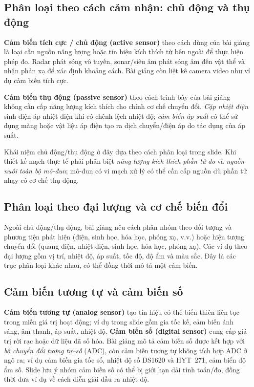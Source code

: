 \subsection{Phân loại theo cách cảm nhận: chủ động và thụ động}
\textbf{Cảm biến tích cực / chủ động (active sensor)} theo cách dùng của bài giảng là loại cần nguồn năng lượng hoặc tín hiệu kích thích từ bên ngoài để thực hiện phép đo. Radar phát sóng vô tuyến, sonar/siêu âm phát sóng âm đến vật thể và nhận phản xạ để xác định khoảng cách. Bài giảng còn liệt kê camera video như ví dụ cảm biến tích cực.

\textbf{Cảm biến thụ động (passive sensor)} theo cách trình bày của bài giảng không cần cấp năng lượng kích thích cho chính cơ chế chuyển đổi. \emph{Cặp nhiệt điện} sinh điện áp nhiệt điện khi có chênh lệch nhiệt độ; \emph{cảm biến áp suất} có thể sử dụng màng hoặc vật liệu áp điện tạo ra dịch chuyển/điện áp do tác dụng của áp suất.
\begin{noteiot}
Khái niệm chủ động/thụ động ở đây dựa theo cách phân loại trong slide. Khi thiết kế mạch thực tế phải phân biệt \emph{năng lượng kích thích phần tử đo} và \emph{nguồn nuôi toàn bộ mô-đun}; mô-đun có vi mạch xử lý có thể cần cấp nguồn dù phần tử nhạy có cơ chế thụ động.
\end{noteiot}
\subsection{Phân loại theo đại lượng và cơ chế biến đổi}
Ngoài chủ động/thụ động, bài giảng nêu cách phân nhóm theo đối tượng và phương tiện phát hiện (điện, sinh học, hóa học, phóng xạ, v.v.) hoặc hiện tượng chuyển đổi (quang điện, nhiệt điện, sinh học, hóa học, phóng xạ). Các ví dụ theo đại lượng gồm vị trí, nhiệt độ, áp suất, tốc độ, độ ẩm và màu sắc. Đây là các trục phân loại khác nhau, có thể đồng thời mô tả một cảm biến.
\subsection{Cảm biến tương tự và cảm biến số}
\textbf{Cảm biến tương tự (analog sensor)} tạo tín hiệu có thể biến thiên liên tục trong miền giá trị hoạt động; ví dụ trong slide gồm gia tốc kế, cảm biến ánh sáng, âm thanh, áp suất, nhiệt độ. \textbf{Cảm biến số (digital sensor)} cung cấp giá trị rời rạc hoặc dữ liệu đã số hóa. Bài giảng mô tả cảm biến số được kết hợp với \emph{bộ chuyển đổi tương tự--số} (ADC), còn cảm biến tương tự không tích hợp ADC ở ngõ ra; ví dụ cảm biến gia tốc số, nhiệt độ số DS1620 và HYT~271, cảm biến độ ẩm số. Slide lưu ý nhóm cảm biến số có thể bị giới hạn dải tính toán/đo, đồng thời đưa ví dụ về cách diễn giải đầu ra nhiệt độ.


